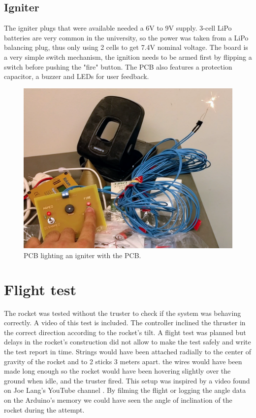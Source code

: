 \subsection{Igniter}
The igniter plugs that were available needed a 6V to 9V supply. 3-cell LiPo batteries are very common in the university, so the power was taken from a LiPo balancing plug, thus only using 2 cells to get 7.4V nominal voltage. The board is a very simple switch mechanism, the ignition needs to be armed first by flipping a switch before pushing the "fire" button. The PCB also features a protection capacitor, a buzzer and LEDs for user feedback.

\begin{figure} [h]
	\centering
	\includegraphics[width=0.8\linewidth]{figures/Rocket/implementation/igniter_PCB.png}
	\caption{PCB lighting an igniter with the PCB.}
	\label{fig:igniter_board}
\end{figure}

\section{Flight test}
The rocket was tested without the truster to check if the system was behaving correctly. A video of this test is included. The controller inclined the thruster in the correct direction according to the rocket's tilt.
A flight test was planned but delays in the rocket's construction did not allow to make the test safely and write the test report in time.
Strings would have been attached radially to the center of gravity of the rocket and to 2 sticks 3 meters apart. the wires would have been made long enough so the rocket would have been hovering slightly over the ground when idle, and the truster fired. This setup was inspired by a video found on Joe Lang's YouTube channel \cite{web:test_rocket}.
By filming the flight or logging the angle data on the Arduino's memory we could have seen the angle of inclination of the rocket during the attempt.